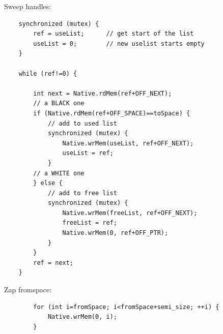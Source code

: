 Sweep handles:
\begin{verbatim}
    synchronized (mutex) {
        ref = useList;      // get start of the list
        useList = 0;        // new uselist starts empty
    }

    while (ref!=0) {

        int next = Native.rdMem(ref+OFF_NEXT);
        // a BLACK one
        if (Native.rdMem(ref+OFF_SPACE)==toSpace) {
            // add to used list
            synchronized (mutex) {
                Native.wrMem(useList, ref+OFF_NEXT);
                useList = ref;
            }
        // a WHITE one
        } else {
            // add to free list
            synchronized (mutex) {
                Native.wrMem(freeList, ref+OFF_NEXT);
                freeList = ref;
                Native.wrMem(0, ref+OFF_PTR);
            }
        }
        ref = next;
    }
\end{verbatim}

Zap fromspace:
\begin{verbatim}
        for (int i=fromSpace; i<fromSpace+semi_size; ++i) {
            Native.wrMem(0, i);
        }
\end{verbatim}
